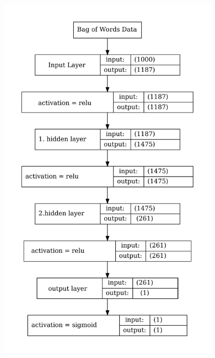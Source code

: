 \documentclass[aspectratio=1610, professionalfonts, 9pt]{beamer}
\begin{document}
\begin{frame}
\begin{columns}
\begin{figure}
          \includegraphics[width=\textwidth]{pictures/bow/opt_model_bow2.pdf}
          \caption{}
          \label{}
      \end{figure}
      
    \end{columns}
  \end{frame}
\end{document}
